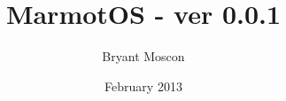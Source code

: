 \documentclass[a4paper,12pt]{article}
\begin{document}
\title{MarmotOS - ver 0.0.1}
\author{Bryant Moscon}
\date{February 2013}
\maketitle
\end{document}
